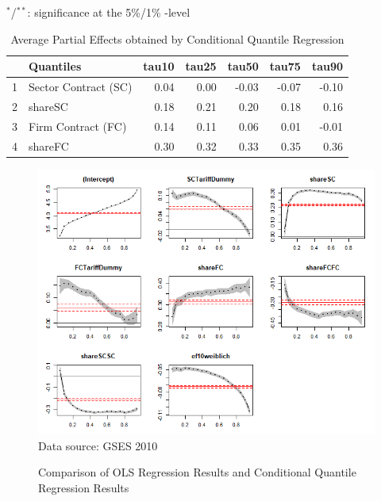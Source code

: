 \begin{landscape}
\begin{table}[]
$^{*}$/$^{**}$: significance at the 5\%/1\% -level
\end{table}
\begin{table}[]
\scriptsize
\centering
\caption{Average Partial Effects obtained by Conditional Quantile Regression}\vspace{0.2cm}
\label{APEs:CQRimplement}
\begin{tabular}{rlrrrrr}
  \hline
 & Quantiles & tau10 & tau25 & tau50 & tau75 & tau90 \\
  \hline
1 & Sector Contract (SC) & 0.04 & 0.00 & -0.03 & -0.07 & -0.10 \\
  2 & shareSC & 0.18 & 0.21 & 0.20 & 0.18 & 0.16 \\
  3 & Firm Contract (FC) & 0.14 & 0.11 & 0.06 & 0.01 & -0.01 \\
  4 & shareFC & 0.30 & 0.32 & 0.33 & 0.35 & 0.36 \\
   \hline
\end{tabular}
\end{table}
\end{landscape}

\begin{landscape}
\begin{figure}[ht]
  \begin{center}
   \caption{Comparison of OLS Regression Results and Conditional Quantile Regression Results}
   \bigskip
    \includegraphics[width=195mm,scale=0.5]{Rplot01}\\
    \label{Fig:CQROLScomparison}
    \footnotesize Data source: GSES 2010
  \end{center}
\end{figure}
\end{landscape}
